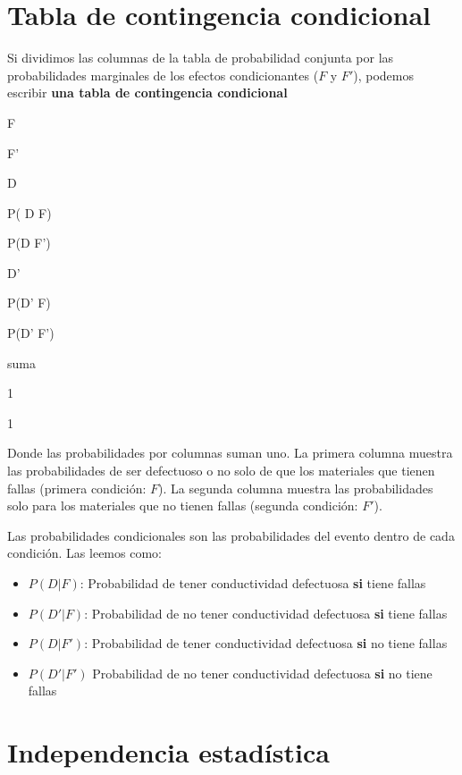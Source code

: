 \documentclass[
]{book}
\begin{document}
\hypertarget{tabla-de-contingencia-condicional}{%
\section{Tabla de contingencia condicional}\label{tabla-de-contingencia-condicional}}

Si dividimos las columnas de la tabla de probabilidad conjunta por las probabilidades marginales de los efectos condicionantes (\(F\) y \(F'\)), podemos escribir \textbf{una tabla de contingencia condicional}

F

F'

D

P( D {\textbar{}} F)

P(D {\textbar{}} F')

D'

P(D' {\textbar{}} F)

P(D' {\textbar{}} F')

suma

1

1

Donde las probabilidades por columnas suman uno. La primera columna muestra las probabilidades de ser defectuoso o no solo de que los materiales que tienen fallas (primera condición: \(F\)). La segunda columna muestra las probabilidades solo para los materiales que no tienen fallas (segunda condición: \(F'\)).

Las probabilidades condicionales son las probabilidades del evento dentro de cada condición. Las leemos como:

\begin{itemize}
\item
  \(P(D|F)\): Probabilidad de tener conductividad defectuosa \textbf{si} tiene fallas
\item
  \(P(D'|F)\): Probabilidad de no tener conductividad defectuosa \textbf{si} tiene fallas
\item
  \(P(D|F')\): Probabilidad de tener conductividad defectuosa \textbf{si} no tiene fallas
\item
  \(P(D'|F')\) Probabilidad de no tener conductividad defectuosa \textbf{si} no tiene fallas
\end{itemize}

\hypertarget{independencia-estaduxedstica-1}{%
\section{Independencia estadística}\label{independencia-estaduxedstica-1}}
\end{document}
